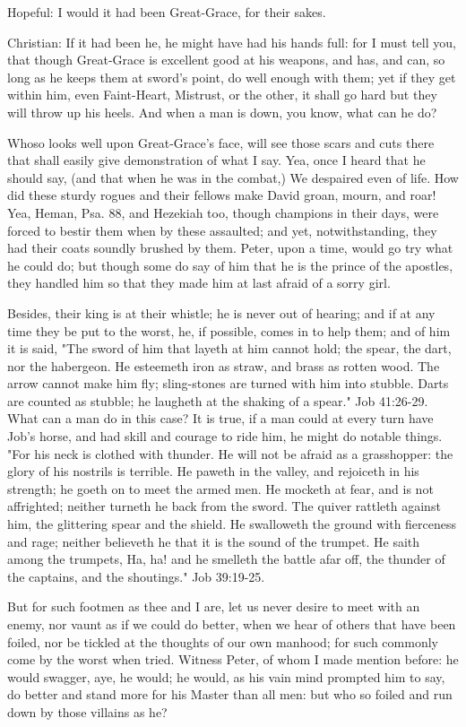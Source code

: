Hopeful: I would it had been Great-Grace, for their sakes.

Christian: If it had been he, he might have had his hands full: for I
must tell you, that though Great-Grace is excellent good at his
weapons, and has, and can, so long as he keeps them at sword's point,
do well enough with them; yet if they get within him, even Faint-Heart,
Mistrust, or the other, it shall go hard but they will throw up his
heels. And when a man is down, you know, what can he do?

Whoso looks well upon Great-Grace's face, will see those scars and cuts
there that shall easily give demonstration of what I say. Yea, once I
heard that he should say, (and that when he was in the combat,) We
despaired even of life. How did these sturdy rogues and their fellows
make David groan, mourn, and roar! Yea, Heman, Psa. 88, and Hezekiah
too, though champions in their days, were forced to bestir them when by
these assaulted; and yet, notwithstanding, they had their coats soundly
brushed by them. Peter, upon a time, would go try what he could do; but
though some do say of him that he is the prince of the apostles, they
handled him so that they made him at last afraid of a sorry girl.

Besides, their king is at their whistle; he is never out of hearing;
and if at any time they be put to the worst, he, if possible, comes in
to help them; and of him it is said, "The sword of him that layeth at
him cannot hold; the spear, the dart, nor the habergeon. He esteemeth
iron as straw, and brass as rotten wood. The arrow cannot make him fly;
sling-stones are turned with him into stubble. Darts are counted as
stubble; he laugheth at the shaking of a spear." Job 41:26-29. What can
a man do in this case? It is true, if a man could at every turn have
Job's horse, and had skill and courage to ride him, he might do notable
things. "For his neck is clothed with thunder. He will not be afraid as
a grasshopper: the glory of his nostrils is terrible. He paweth in the
valley, and rejoiceth in his strength; he goeth on to meet the armed
men. He mocketh at fear, and is not affrighted; neither turneth he back
from the sword. The quiver rattleth against him, the glittering spear
and the shield. He swalloweth the ground with fierceness and rage;
neither believeth he that it is the sound of the trumpet. He saith
among the trumpets, Ha, ha! and he smelleth the battle afar off, the
thunder of the captains, and the shoutings." Job 39:19-25.

But for such footmen as thee and I are, let us never desire to meet
with an enemy, nor vaunt as if we could do better, when we hear of
others that have been foiled, nor be tickled at the thoughts of our own
manhood; for such commonly come by the worst when tried. Witness Peter,
of whom I made mention before: he would swagger, aye, he would; he
would, as his vain mind prompted him to say, do better and stand more
for his Master than all men: but who so foiled and run down by those
villains as he?

